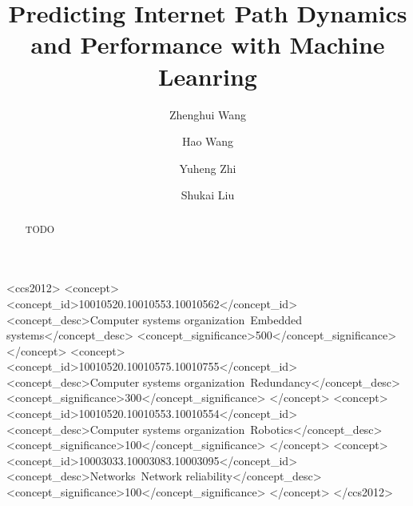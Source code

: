 \documentclass[sigconf]{acmart}
\begin{document}
\title{Predicting Internet Path Dynamics and Performance with Machine Leanring}


\author{Zhenghui Wang}

\author{Hao Wang}

\author{Yuheng Zhi}

\author{Shukai Liu}

\renewcommand{\shortauthors}{CN Group}


\begin{abstract}
TODO
\end{abstract}

%
%
\begin{CCSXML}
<ccs2012>
 <concept>
  <concept_id>10010520.10010553.10010562</concept_id>
  <concept_desc>Computer systems organization~Embedded systems</concept_desc>
  <concept_significance>500</concept_significance>
 </concept>
 <concept>
  <concept_id>10010520.10010575.10010755</concept_id>
  <concept_desc>Computer systems organization~Redundancy</concept_desc>
  <concept_significance>300</concept_significance>
 </concept>
 <concept>
  <concept_id>10010520.10010553.10010554</concept_id>
  <concept_desc>Computer systems organization~Robotics</concept_desc>
  <concept_significance>100</concept_significance>
 </concept>
 <concept>
  <concept_id>10003033.10003083.10003095</concept_id>
  <concept_desc>Networks~Network reliability</concept_desc>
  <concept_significance>100</concept_significance>
 </concept>
</ccs2012>  
\end{CCSXML}

\end{document}

